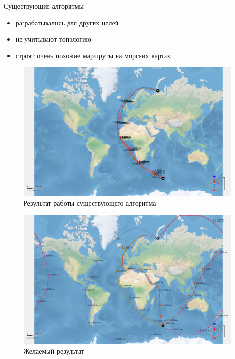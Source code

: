 \documentclass[mathserif]{beamer}
\begin{document}
\begin{frame}{Существующие алгоритмы}
    \begin{itemize}
        \item<1-3> разрабатывались для других целей
        \item<2-3> не учитывают топологию
        \item<3-3> строят очень похожие маршруты на морских картах
    \end{itemize}
     {
        \begin{figure}
            \includegraphics[width=.8\textwidth]{comparison-with-existing-bad}
            \caption{Результат работы существующего алгоритма}
        \end{figure}
    }
     {
        \begin{figure}
            \includegraphics[width=.8\textwidth]{comparison-with-existing-good}
            \caption{Желаемый результат}
        \end{figure}
    }
\end{frame}
\end{document}
